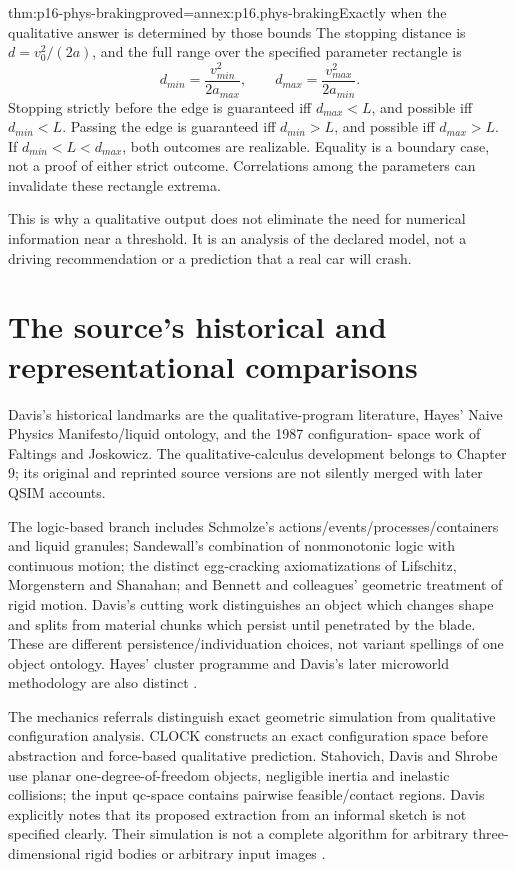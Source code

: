 \begin{hbtheorem}{thm:p16-phys-braking}{proved=annex:p16.phys-braking}{Exactly when the qualitative answer is determined by those bounds}
The stopping distance is \(d=v_0^2/(2a)\), and the full range over
the specified parameter rectangle is
\[
 d_{min}=\frac{v_{min}^2}{2a_{max}},\qquad
 d_{max}=\frac{v_{max}^2}{2a_{min}}.
\]
Stopping strictly before the edge is guaranteed iff \(d_{max}<L\),
and possible iff \(d_{min}<L\). Passing the edge is guaranteed iff
\(d_{min}>L\), and possible iff \(d_{max}>L\). If
\(d_{min}<L<d_{max}\), both outcomes are realizable. Equality is
a boundary case, not a proof of either strict outcome. Correlations among
the parameters can invalidate these rectangle extrema.
\end{hbtheorem}

This is why a qualitative output does not eliminate the need for numerical
information near a threshold. It is an analysis of the declared model,
not a driving recommendation or a prediction that a real car will crash.

\section{The source's historical and representational comparisons}
\label{sec:p16-phys-history}

Davis's historical landmarks are the qualitative-program literature,
Hayes' Naive Physics Manifesto/liquid ontology, and the 1987 configuration-
space work of Faltings and Joskowicz. The qualitative-calculus development
belongs to Chapter 9; its original and reprinted source versions are not
silently merged with later QSIM accounts.

The logic-based branch includes Schmolze's actions/events/processes/containers
and liquid granules; Sandewall's combination of nonmonotonic logic with
continuous motion; the distinct egg-cracking axiomatizations of Lifschitz,
Morgenstern and Shanahan; and Bennett and colleagues' geometric treatment of
rigid motion. Davis's cutting work distinguishes an object which changes
shape and splits from material chunks which persist until penetrated by the
blade. These are different persistence/individuation choices, not variant
spellings of one object ontology. Hayes' cluster programme and Davis's later
microworld methodology are also distinct
\cite[pp.~614--615]{Davis2008PhysicalReasoning}.

The mechanics referrals distinguish exact geometric simulation from qualitative
configuration analysis. CLOCK constructs an exact configuration space before
abstraction and force-based qualitative prediction. Stahovich, Davis and
Shrobe use planar one-degree-of-freedom objects, negligible inertia and
inelastic collisions; the input qc-space contains pairwise feasible/contact
regions. Davis explicitly notes that its proposed extraction from an informal
sketch is not specified clearly. Their simulation is not a complete algorithm
for arbitrary three-dimensional rigid bodies or arbitrary input images
\cite[pp.~615--616]{Davis2008PhysicalReasoning}.

